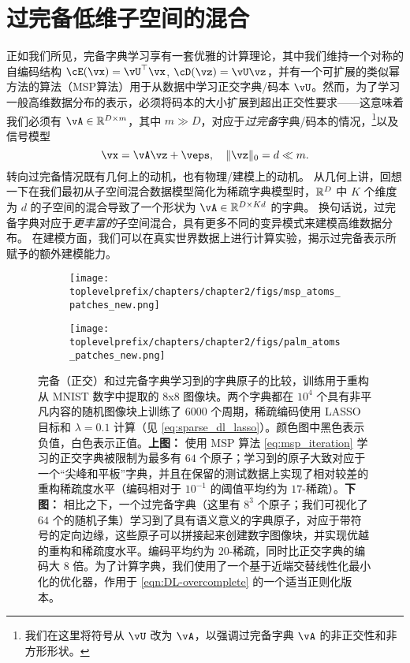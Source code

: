 \documentclass[../../book-main_zh.tex]{subfiles}
\begin{document}
\section{过完备低维子空间的混合}
\label{sec:dictionary_learning}
正如我们所见，完备字典学习享有一套优雅的计算理论，其中我们维持一个对称的自编码结构 $\cE(\vx) = \vU^\top \vx$, $\cD(\vz) = \vU \vz$，并有一个可扩展的类似幂方法的算法（MSP算法）用于从数据中学习正交字典/码本 $\vU$。然而，为了学习一般高维数据分布的表示，必须将码本的大小扩展到超出正交性要求——这意味着我们必须有 $\vA \in \R^{D \times m}$，其中 $m \gg D$，对应于\textit{过完备}字典/码本的情况，\footnote{我们在这里将符号从 $\vU$ 改为 $\vA$，以强调过完备字典 $\vA$ 的非正交性和非方形形状。}以及信号模型
\begin{equation}\label{eq:model-DL-overcomplete}
    \vx =  \vA \vz + \veps,
    \quad
    \norm{\vz}_0 = d \ll m.
\end{equation}
转向过完备情况既有几何上的动机，也有物理/建模上的动机。
从几何上讲，回想一下在我们最初从子空间混合数据模型简化为稀疏字典模型时，$\mathbb{R}^D$ 中 $K$ 个维度为 $d$ 的子空间的混合导致了一个形状为 $\vA \in \R^{D \times Kd}$ 的字典。
换句话说，过完备字典对应于\textit{更丰富的}子空间混合，具有更多不同的变异模式来建模高维数据分布。
在建模方面，我们可以在真实世界数据上进行计算实验，揭示过完备表示所赋予的额外建模能力。

\begin{figure}[t]
\centering
    \begin{subfigure}{0.9\linewidth}
        \centering
        \texttt{[image: \\toplevelprefix/chapters/chapter2/figs/msp\_atoms\_patches\_new.png]}
        \caption{}
    \end{subfigure}
    \begin{subfigure}{0.9\linewidth}
        \centering
        \texttt{[image: \\toplevelprefix/chapters/chapter2/figs/palm\_atoms\_patches\_new.png]}
        \caption{}
    \end{subfigure}
    \caption{完备（正交）和过完备字典学习到的字典原子的比较，训练用于重构从 MNIST 数字中提取的 8x8 图像块。两个字典都在 $10^4$ 个具有非平凡内容的随机图像块上训练了 $6000$ 个周期，稀疏编码使用 LASSO 目标和 $\lambda=0.1$ 计算（见 \eqref{eq:sparse_dl_lasso}）。颜色图中黑色表示负值，白色表示正值。\textbf{上图：} 使用 MSP 算法 \eqref{eq:msp_iteration} 学习的正交字典被限制为最多有 $64$ 个原子；学习到的原子大致对应于一个“尖峰和平板”字典，并且在保留的测试数据上实现了相对较差的重构稀疏度水平（编码相对于 $10^{-1}$ 的阈值平均约为 $17$-稀疏）。\textbf{下图：} 相比之下，一个过完备字典（这里有 $8^3$ 个原子；我们可视化了 $64$ 个的随机子集）学习到了具有语义意义的字典原子，对应于带符号的定向边缘，这些原子可以拼接起来创建数字图像块，并实现优越的重构和稀疏度水平。编码平均约为 $20$-稀疏，同时比正交字典的编码大 $8$ 倍。为了计算字典，我们使用了一个基于近端交替线性化最小化的优化器，作用于 \eqref{eqn:DL-overcomplete} 的一个适当正则化版本。}
    \label{fig:ReconMNIST}
\end{figure}
\end{document}
